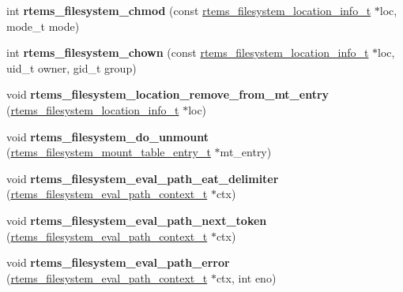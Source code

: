 \begin{DoxyCompactItemize}
int {\bfseries rtems\+\_\+filesystem\+\_\+chmod} (const \mbox{\hyperlink{group__LibIO_ga3252b3d31ee3c49ffff0b7604a676864}{rtems\+\_\+filesystem\+\_\+location\+\_\+info\+\_\+t}} $\ast$loc, mode\+\_\+t mode)
\item 
\mbox{\label{group__LibIOInternal_ga44adbd6533a367e6bd9e15f07cafe535}} 
int {\bfseries rtems\+\_\+filesystem\+\_\+chown} (const \mbox{\hyperlink{group__LibIO_ga3252b3d31ee3c49ffff0b7604a676864}{rtems\+\_\+filesystem\+\_\+location\+\_\+info\+\_\+t}} $\ast$loc, uid\+\_\+t owner, gid\+\_\+t group)
\item 
\mbox{\label{group__LibIOInternal_ga8e6d08c28007d47a06a60c439d22e712}} 
void {\bfseries rtems\+\_\+filesystem\+\_\+location\+\_\+remove\+\_\+from\+\_\+mt\+\_\+entry} (\mbox{\hyperlink{group__LibIO_ga3252b3d31ee3c49ffff0b7604a676864}{rtems\+\_\+filesystem\+\_\+location\+\_\+info\+\_\+t}} $\ast$loc)
\item 
\mbox{\label{group__LibIOInternal_ga37bd5a7533e4b52566f6d9e18d71d765}} 
void {\bfseries rtems\+\_\+filesystem\+\_\+do\+\_\+unmount} (\mbox{\hyperlink{structrtems__filesystem__mount__table__entry__tt}{rtems\+\_\+filesystem\+\_\+mount\+\_\+table\+\_\+entry\+\_\+t}} $\ast$mt\+\_\+entry)
\item 
\mbox{\label{group__LibIOInternal_ga8f7198f340b9ba2a1163349ff3ed2473}} 
void {\bfseries rtems\+\_\+filesystem\+\_\+eval\+\_\+path\+\_\+eat\+\_\+delimiter} (\mbox{\hyperlink{structrtems__filesystem__eval__path__context__t}{rtems\+\_\+filesystem\+\_\+eval\+\_\+path\+\_\+context\+\_\+t}} $\ast$ctx)
\item 
\mbox{\label{group__LibIOInternal_ga76a2a38396beeac524a6313437eb3cc3}} 
void {\bfseries rtems\+\_\+filesystem\+\_\+eval\+\_\+path\+\_\+next\+\_\+token} (\mbox{\hyperlink{structrtems__filesystem__eval__path__context__t}{rtems\+\_\+filesystem\+\_\+eval\+\_\+path\+\_\+context\+\_\+t}} $\ast$ctx)
\item 
\mbox{\label{group__LibIOInternal_ga6a883290d840811af50d79ef006e2798}} 
void {\bfseries rtems\+\_\+filesystem\+\_\+eval\+\_\+path\+\_\+error} (\mbox{\hyperlink{structrtems__filesystem__eval__path__context__t}{rtems\+\_\+filesystem\+\_\+eval\+\_\+path\+\_\+context\+\_\+t}} $\ast$ctx, int eno)

\end{DoxyCompactItemize}
